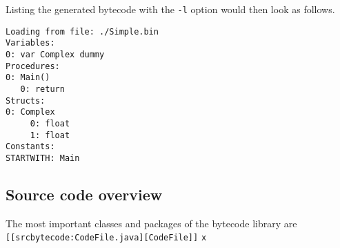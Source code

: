 \documentclass[11pt]{article}
\begin{document}
Listing the generated bytecode with the \texttt{-l} option would then look as
follows.

\begin{verbatim}
Loading from file: ./Simple.bin
Variables:
0: var Complex dummy
Procedures:
0: Main()
   0: return
Structs:
0: Complex
     0: float
     1: float
Constants:
STARTWITH: Main
\end{verbatim}



\subsection{Source code overview}
\label{sec:org852c119}

The most important classes and packages of the bytecode library are
\texttt{[[srcbytecode:CodeFile.java][CodeFile]]} \texttt{x}
\end{document}
